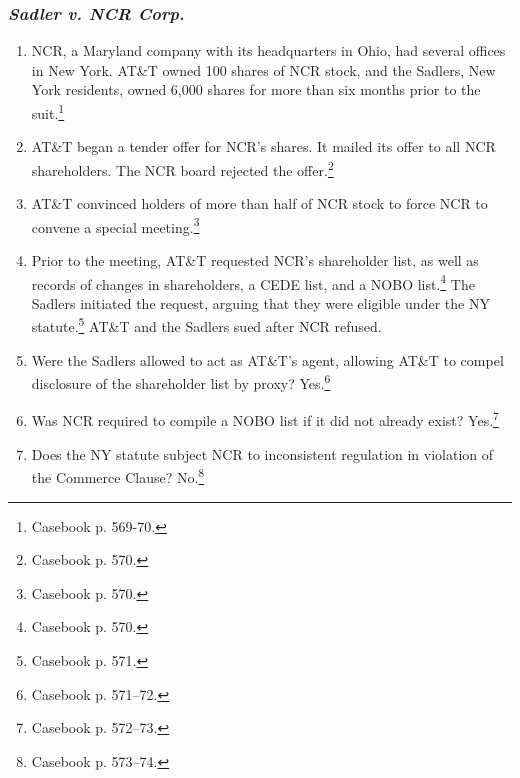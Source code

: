 \subsubsection{\emph{Sadler v. NCR Corp.}}

\begin{enumerate}
    \item NCR, a Maryland company with its headquarters in Ohio, had several 
    offices in New York. AT\&T owned 100 shares of NCR stock, and the Sadlers, 
    New York residents, owned 6,000 shares for more than six months prior to the 
    suit.\footnote{Casebook p. 569-70.}
    \item AT\&T began a tender offer for NCR's shares. It mailed its offer to 
    all NCR shareholders. The NCR board rejected the offer.\footnote{Casebook p. 
    570.}
    \item AT\&T convinced holders of more than half of NCR stock to force NCR to 
    convene a special meeting.\footnote{Casebook p. 570.}
    \item Prior to the meeting, AT\&T requested NCR's shareholder list, as well 
    as records of changes in shareholders, a CEDE list, and a NOBO 
    list.\footnote{Casebook p. 570.} The Sadlers initiated the request, arguing 
    that they were eligible under the NY statute.\footnote{Casebook p. 571.} 
    AT\&T and the Sadlers sued after NCR refused.
    \item Were the Sadlers allowed to act as AT\&T's agent, allowing AT\&T to 
    compel disclosure of the shareholder list by proxy? Yes.\footnote{Casebook 
    p. 571--72.}
    \item Was NCR required to compile a NOBO list if it did not already 
    exist? Yes.\footnote{Casebook p. 572--73.}
    \item Does the NY statute subject NCR to inconsistent regulation in 
    violation of the Commerce Clause? No.\footnote{Casebook p. 573--74.}
\end{enumerate}
